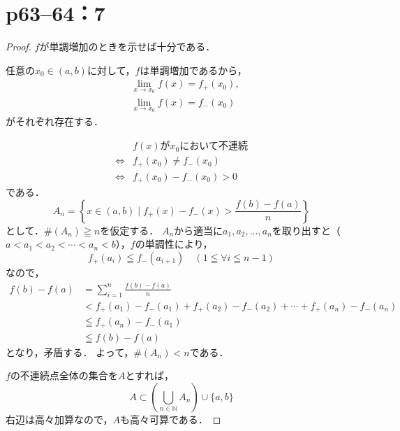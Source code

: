 \documentclass[a4paper,10pt,fleqn]{ltjsarticle}
\begin{document}
\section*{p63--64：7}
\begin{leftbar}
    \begin{proof} $f$が単調増加のときを示せば十分である．

        任意の$ x_0 \in (a,b)$に対して，$f$は単調増加であるから，
        \begin{align*}
             & \lim_{x \to x_0} f(x)=f_{+} (x_0) , \\
             & \lim_{x \to x_0} f(x)=f_{-} (x_0)
        \end{align*}
        がそれぞれ存在する．

        \begin{align*}
                 & \text{$f(x)$が$x_0$において不連続}  \\
            \iff & f_{+} (x_0) \ne f_{-} (x_0) \\
            \iff & f_{+} (x_0) - f_{-} (x_0)>0
        \end{align*}
        である．
        \[
            A_n =  \left \{ x \in (a,b) \mid f_{+} (x) - f_{-} (x) > \frac{f(b)-f(a)}{n} \right \}
        \]
        として．$\# (A_n) \geqq n$を仮定する．
        $A_n$から適当に$a_1,a_2,\ldots,a_n$を取り出すと（$a<a_1 < a_2 < \cdots < a_n<b$），$f$の単調性により，
        \[
            f_{+} (a_i) \leqq f_{-} (a_{i+1}) \quad (1 \leqq \forall i \leqq n-1)
        \]
        なので，
        \begin{align*}
            f(b)-f(a) & = \sum_{i=1}^{n} \frac{f(b)-f(a)}{n}                                                         \\
                      & < f_{+} (a_1) - f_{-} (a_1) + f_{+} (a_2) - f_{-} (a_2) + \cdots + f_{+} (a_n) - f_{-} (a_n) \\
                      & \leqq f_{+} (a_n) - f_{-} (a_1)                                                              \\
                      & \leqq f(b)-f(a)
        \end{align*}
        となり，矛盾する．
        よって，$\# (A_n) < n$である．

        $f$の不連続点全体の集合を$A$とすれば，
        \[
            A \subset \left ( \bigcup_{n \in \mathbb{N}}  A_n \right ) \cup \{ a, b \}
        \]
        右辺は高々加算なので，$A$も高々可算である．
    \end{proof}
\end{leftbar}
\end{document}

